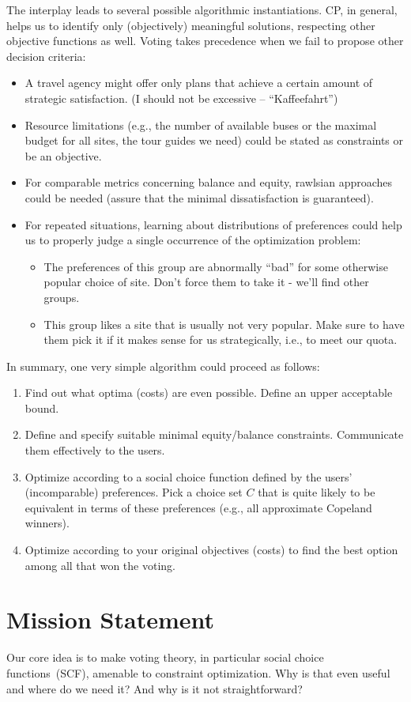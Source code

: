\documentclass[10pt,a4paper,fleqn]{article}
\begin{document}
The interplay leads to several possible algorithmic instantiations. CP, in general, helps us to identify only (objectively) meaningful solutions, respecting other objective functions as well. Voting takes precedence when we fail to propose other decision criteria:
\begin{itemize}
\item A travel agency might offer only plans that achieve a certain amount of strategic satisfaction. (I should not be excessive -- ``Kaffeefahrt'')
\item Resource limitations (e.g., the number of available buses or the maximal budget for all sites, the tour guides we need) could be stated as constraints or be an objective.
\item For comparable metrics concerning balance and equity, rawlsian approaches could be needed (assure that the minimal dissatisfaction is guaranteed).  
\item For repeated situations, learning about distributions of preferences could help us to properly judge a single occurrence of the optimization problem:
\begin{itemize}
\item The preferences of this group are abnormally ``bad'' for some otherwise popular choice of site. Don't force them to take it - we'll find other groups.
\item This group likes a site that is usually not very popular. Make sure to have them pick it if it makes sense for us strategically, i.e., to meet our quota.
\end{itemize}
\end{itemize}
In summary, one very simple algorithm could proceed as follows:
\begin{enumerate}
\item Find out what optima (costs) are even possible. Define an upper acceptable bound.
\item Define and specify suitable minimal equity/balance constraints. Communicate them effectively to the users.
\item Optimize according to a social choice function defined by the users' (incomparable) preferences. Pick a choice set $C$ that is quite likely to be equivalent in terms of these preferences (e.g., all approximate Copeland winners).
\item Optimize according to your original objectives (costs) to find the best option among all that won the voting.  
\end{enumerate}
\section{Mission Statement}
Our core idea is to make voting theory, in particular social choice functions~(SCF), amenable
to constraint optimization. Why is that even useful and where do we need it? And why is it not
straightforward?
\end{document}
